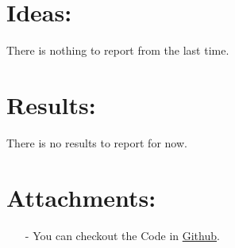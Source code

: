 \documentclass[a4paper, 11pt]{article}
\begin{document}
	\section*{Ideas:}
	There is nothing to report from the last time.
	
	\section*{Results:}
	There is no results to report for now.
	
	\section*{Attachments:}
	
	\begin{itemize}
		\item[-] You can checkout the Code in \href{https://github.com/Ethiy/3DSceneModel}{Github}.
	\end{itemize}
	
\end{document}
